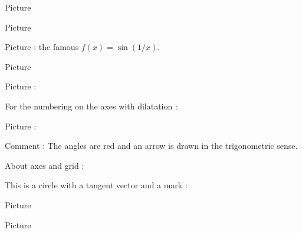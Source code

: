 


Picture 
\newcommand{\CaptionFigOMPAooMbyOIqeA}{Marks are correct.}


\clearpage


Picture 
\begin{center}
   
\end{center}
   

\clearpage


Picture  : the famous \( f(x)=\sin(1/x)\).
\begin{center}
   
\end{center}
   

Picture 
\begin{center}
   
\end{center}
   

Picture : 
\begin{center}
   
\end{center}
   

For the numbering on the axes with dilatation : 
\begin{center}
   
\end{center}



Picture : 
\begin{center}
   
\end{center}
Comment : The angles are red and an arrow is drawn in the trigonometric sense.



About axes and grid : 
\begin{center}
   
\end{center}
   


This is a circle with a tangent vector and a mark :

\begin{center}
    
\end{center}



Picture 
\begin{center}
   
\end{center}

Picture 
\begin{center}
   
\end{center}


